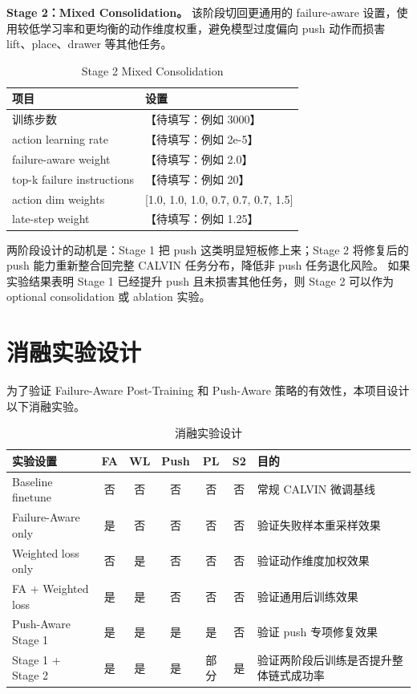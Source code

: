 \documentclass[10pt,a4paper,fontset=none]{ctexart}
\newcommand{\todo}[1]{\textcolor{TodoRed}{【#1】}}
\begin{document}
\textbf{Stage 2：Mixed Consolidation。}
该阶段切回更通用的 failure-aware 设置，使用较低学习率和更均衡的动作维度权重，避免模型过度偏向 push 动作而损害 lift、place、drawer 等其他任务。

\begin{table}[H]
\centering
\caption{Stage 2 Mixed Consolidation}
\begin{tabularx}{0.86\textwidth}{lX}
\toprule
项目 & 设置 \\
\midrule
训练步数 & \todo{待填写：例如 3000} \\
action learning rate & \todo{待填写：例如 2e-5} \\
failure-aware weight & \todo{待填写：例如 2.0} \\
top-k failure instructions & \todo{待填写：例如 20} \\
action dim weights & [1.0, 1.0, 1.0, 0.7, 0.7, 0.7, 1.5] \\
late-step weight & \todo{待填写：例如 1.25} \\
\bottomrule
\end{tabularx}
\end{table}

两阶段设计的动机是：Stage 1 把 push 这类明显短板修上来；Stage 2 将修复后的 push 能力重新整合回完整 CALVIN 任务分布，降低非 push 任务退化风险。
如果实验结果表明 Stage 1 已经提升 push 且未损害其他任务，则 Stage 2 可以作为 optional consolidation 或 ablation 实验。

\section{消融实验设计}

为了验证 Failure-Aware Post-Training 和 Push-Aware 策略的有效性，本项目设计以下消融实验。

\begin{table}[H]
\centering
\caption{消融实验设计}
\scriptsize
\begin{tabularx}{\textwidth}{>{\raggedright\arraybackslash}p{}cccccX}
\toprule
实验设置 & FA & WL & Push & PL & S2 & 目的 \\
\midrule
Baseline finetune & 否 & 否 & 否 & 否 & 否 & 常规 CALVIN 微调基线 \\
Failure-Aware only & 是 & 否 & 否 & 否 & 否 & 验证失败样本重采样效果 \\
Weighted loss only & 否 & 是 & 否 & 否 & 否 & 验证动作维度加权效果 \\
FA + Weighted loss & 是 & 是 & 否 & 否 & 否 & 验证通用后训练效果 \\
Push-Aware Stage 1 & 是 & 是 & 是 & 是 & 否 & 验证 push 专项修复效果 \\
Stage 1 + Stage 2 & 是 & 是 & 是 & 部分 & 是 & 验证两阶段后训练是否提升整体链式成功率 \\
\bottomrule
\end{tabularx}
\end{table}
\end{document}
